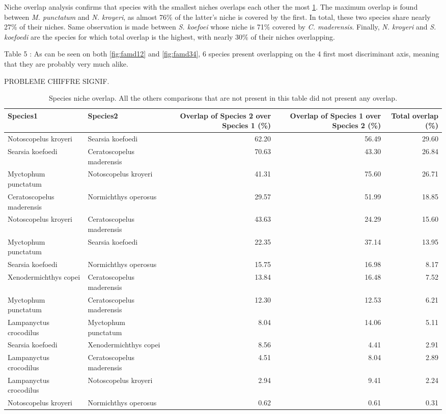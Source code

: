 Niche overlap analysis confirms that species with the smallest niches overlaps each other the most \ref{table:ell_ovlp}. The maximum overlap is found between \textit{M. punctatum} and \textit{N. kroyeri}, as almost 76\% of the latter's niche is covered by the first. In total, these two species share nearly 27\% of their niches. Same observation is made between \textit{S. koefoei} whose niche is 71\% covered by \textit{C. maderensis}. Finally, \textit{N. kroyeri} and \textit{S. koefoedi} are the species for which total overlap is the highest, with nearly 30\% of their niches overlapping.


Table 5 : As can be seen on both \ref{fig:famd12} and \ref{fig:famd34}, 6 species present overlapping on the 4 first most discriminant axis, meaning that they are probably very much alike. 


PROBLEME CHIFFRE SIGNIF.

\begin{table}[ht]
\centering
\label{table:ell_ovlp}
\caption{Species niche overlap. All the others comparisons that are not present in this table did not present any overlap.}
\begin{adjustbox}{max width=1.1\textwidth,center}
\begin{tabular}{llrrr}
  \hline
Species1 & Species2 & Overlap of Species 2 over Species 1 (\%) & Overlap of Species 1 over Species 2 (\%) & Total overlap (\%)\\ 
  \hline
Notoscopelus kroyeri & Searsia koefoedi & 62.20 & 56.49 & 29.60 \\ 
  Searsia koefoedi & Ceratoscopelus maderensis & 70.63 & 43.30 & 26.84 \\ 
  Myctophum punctatum & Notoscopelus kroyeri & 41.31 & 75.60 & 26.71 \\ 
  Ceratoscopelus maderensis & Normichthys operosus & 29.57 & 51.99 & 18.85 \\ 
  Notoscopelus kroyeri & Ceratoscopelus maderensis & 43.63 & 24.29 & 15.60 \\ 
  Myctophum punctatum & Searsia koefoedi & 22.35 & 37.14 & 13.95 \\ 
  Searsia koefoedi & Normichthys operosus & 15.75 & 16.98 & 8.17 \\ 
  Xenodermichthys copei & Ceratoscopelus maderensis & 13.84 & 16.48 & 7.52 \\ 
  Myctophum punctatum & Ceratoscopelus maderensis & 12.30 & 12.53 & 6.21 \\ 
  Lampanyctus crocodilus & Myctophum punctatum & 8.04 & 14.06 & 5.11 \\ 
  Searsia koefoedi & Xenodermichthys copei & 8.56 & 4.41 & 2.91 \\ 
  Lampanyctus crocodilus & Ceratoscopelus maderensis & 4.51 & 8.04 & 2.89 \\ 
  Lampanyctus crocodilus & Notoscopelus kroyeri & 2.94 & 9.41 & 2.24 \\ 
  Notoscopelus kroyeri & Normichthys operosus & 0.62 & 0.61 & 0.31 \\ 
   \hline
\end{tabular}
\end{adjustbox}
\end{table}


